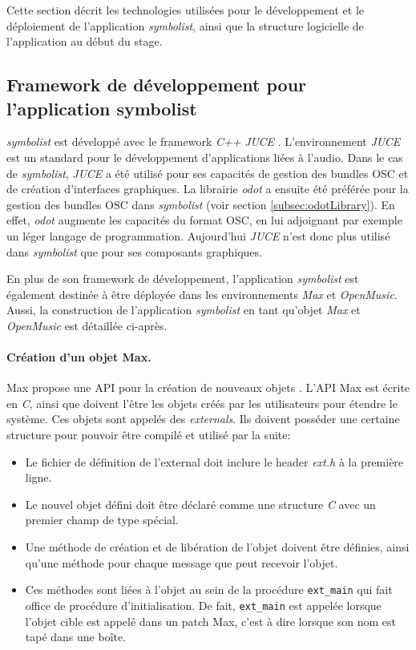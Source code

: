 Cette section décrit les technologies utilisées pour le développement et le déploiement de l'application \textit{symbolist}, ainsi que la structure logicielle de l'application au début du stage.

\subsection{Framework de développement pour l'application symbolist}
\label{subsec:frameworkAndTechnologies}
\textit{symbolist} est développé avec le framework \textit{C++} \textit{JUCE} \cite{juce2018}. L'environnement \textit{JUCE} est un standard pour le développement d'applications liées à l'audio. Dans le cas de \textit{symbolist}, \textit{JUCE} a été utilisé pour ses capacités de gestion des bundles OSC et de création d'interfaces graphiques. La librairie \textit{odot} a ensuite été préférée pour la gestion des bundles OSC dans \textit{symbolist} (voir section \ref{subsec:odotLibrary}). En effet, \textit{odot} augmente les capacités du format OSC, en lui adjoignant par exemple un léger langage de programmation. Aujourd'hui \textit{JUCE} n'est donc plus utilisé dans \textit{symbolist} que pour ses composants graphiques. 

En plus de son framework de développement, l'application \textit{symbolist} est également destinée à être déployée dans les environnements \textit{Max} et \textit{OpenMusic}. Aussi, la construction de l'application \textit{symbolist} en tant qu'objet \textit{Max} et \textit{OpenMusic} est détaillée ci-après.

\paragraph{Création d'un objet Max.} Max propose une API pour la création de nouveaux objets \cite{maxApi2018}. L'API Max est écrite en \textit{C}, ainsi que doivent l'être les objets créés par les utilisateurs pour étendre le système. Ces objets sont appelés des \textit{externals}. Ils doivent posséder une certaine structure pour pouvoir être compilé et utilisé par la suite:
\begin{itemize}[label=--]
	\item Le fichier de définition de l'external doit inclure le header \textit{ext.h} à la première ligne.
	\item Le nouvel objet défini doit être déclaré comme une structure \textit{C} avec un premier champ de type spécial.
	\item Une méthode de création et de libération de l'objet doivent être définies, ainsi qu'une méthode pour chaque message que peut recevoir l'objet.
	\item Ces méthodes sont liées à l'objet au sein de la procédure \lstinline|ext_main| qui fait office de procédure d'initialisation. De fait, \lstinline|ext_main| est appelée lorsque l'objet cible est appelé dans un patch Max, c'est à dire lorsque son nom est tapé dans une boîte.
\end{itemize}

